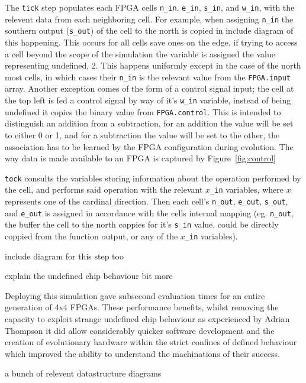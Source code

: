 The \texttt{tick} step populates each FPGA cells \texttt{n\_in}, \texttt{e\_in},
\texttt{s\_in}, and \texttt{w\_in}, with the relevent data from each neighboring cell.
For example, when assigning \texttt{n\_in} the southern output (\texttt{s\_out})
of the cell to the north is copied in \todo include diagram of this happening.
This occurs for all cells save ones on the edge, if trying
to access a cell beyond the scope of the simulation the variable is assigned the value
representing undefined, 2. This happens uniformly except in the case of the north most cells,
in which cases their \texttt{n\_in} is the relevant value from the \texttt{FPGA.input}
array. Another exception comes of the form of a control signal input; the cell at the top
left is fed a control signal by way of it's \texttt{w\_in} variable, instead of being undefined
it copies the binary value from \texttt{FPGA.control}. This is intended to distinguish
an addition from a subtraction, for an addition the value will be set to either 0 or 1,
and for a subtraction the value will be set to the other, the association has to be
learned by the FPGA configuration during evolution. The way data is made available to an FPGA
is captured by Figure~\ref{fig:control}

\texttt{tock} consults the variables storing information about the operation
performed by the cell, and performs said operation with the relevant $x$\texttt{\_in} variables,
where $x$ represents one of the cardinal direction.
Then each cell's \texttt{n\_out}, \texttt{e\_out}, \texttt{s\_out}, and \texttt{e\_out}
is assigned in accordance with the cells internal mapping (eg. \texttt{n\_out}, the
buffer the cell to the north coppies for it's \texttt{s\_in} value, could be directly
coppied from the function output, or any of the $x$\texttt{\_in} variables).

\todo include diagram for this step too

\todo explain the undefined chip behaviour bit more

Deploying this simulation gave subsecond evaluation times for an entire generation of
4x4 FPGAs. These performance benefits, whilst removing the capacity to exploit
strange undefined chip behaviour as experienced by Adrian Thompson\cite{10.1007/3-540-63173-9_61}
it did allow considerably quicker software development and the creation of
evolutionary hardware within the strict confines of defined behaviour which
improved the ability to understand the machinations of their success.

\todo a bunch of relevent datastructure diagrams

